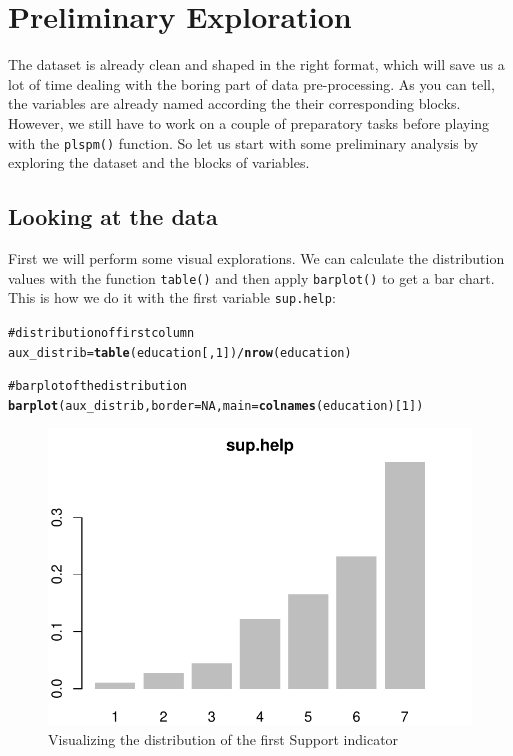 \documentclass[12pt]{book}\usepackage{graphicx, color}
\makeatletter
\newcommand{\hlfunctioncall}[1]{\textcolor[rgb]{0.501960784313725,0,0.329411764705882}{\textbf{#1}}}%
\newcommand{\hlcomment}[1]{\textcolor[rgb]{0.180392156862745,0.6,0.341176470588235}{#1}}%
\newenvironment{kframe}{%
 \def\at@end@of@kframe{}%
 \ifinner\ifhmode%
  \def\at@end@of@kframe{\end{minipage}}%
  \begin{minipage}{\columnwidth}%
 \fi\fi%
 \def\FrameCommand##1{\hskip\@totalleftmargin \hskip-\fboxsep
 \colorbox{shadecolor}{##1}\hskip-\fboxsep
     \hskip-\linewidth \hskip-\@totalleftmargin \hskip\columnwidth}%
 \MakeFramed {\advance\hsize-\width
   \@totalleftmargin\z@ \linewidth\hsize
   \@setminipage}}%
 {\par\unskip\endMakeFramed%
 \at@end@of@kframe}
\newenvironment{knitrout}{}{} %
\newcommand{\fplspm}{\texttt{plspm()}}
\newcommand{\code}[1]{\texttt{#1}}
\makeatother
\begin{document}
\section{Preliminary Exploration}
The dataset is already clean and shaped in the right format, which will save us a lot of time dealing with the boring part of data pre-processing. As you can tell, the variables are already named according the their corresponding blocks. However, we still have to work on a couple of preparatory tasks before playing with the \fplspm{} function. So let us start with some preliminary analysis by exploring the dataset and the blocks of variables.

\subsection{Looking at the data}
First we will perform some visual explorations. We can calculate the distribution values with the function \code{table()} and then apply \code{barplot()} to get a bar chart. This is how we do it with the first variable \code{sup.help}:
\begin{knitrout}
\color{fgcolor}\begin{kframe}
\begin{alltt}
\hlcomment{# distribution of first column}
aux_distrib = \hlfunctioncall{table}(education[, 1])/\hlfunctioncall{nrow}(education)

\hlcomment{# barplot of the distribution}
\hlfunctioncall{barplot}(aux_distrib, border = NA, main = \hlfunctioncall{colnames}(education)[1])
\end{alltt}
\end{kframe}\begin{figure}[h]


{\centering \includegraphics[width=.55\linewidth,height=.4\linewidth]{figure/support_mvs_distrs} 

}

\caption[Visualizing the distribution of the first Support indicator]{Visualizing the distribution of the first Support indicator\label{fig:support_mvs_distrs}}
\end{figure}


\end{knitrout}
\end{document}
